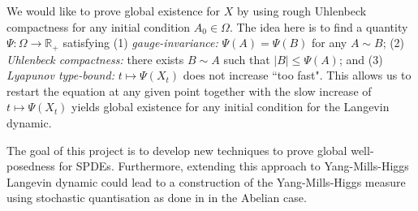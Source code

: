 \documentclass[12pt]{article}
\numberwithin{equation}{section}
\theoremstyle{definition}
\theoremstyle{remark}
\newcommand{\R}{\mathbb R}
\newcommand{\1}{\mathbf 1}
\newcommand{\<}{\langle}
\renewcommand{\>}{\rangle}
\newcommand{\orange}[1]{\textcolor{orange}{#1}}
\begin{document}
We would like to prove global existence for $X$ by using rough Uhlenbeck compactness for any initial condition $A_0\in \Omega$. The idea here is to find a quantity $\Psi:\Omega\to\R_+$ satisfying (1) \textit{gauge-invariance:} $\Psi(A)=\Psi(B)$ for any $A\sim B$; (2) \textit{Uhlenbeck compactness:} there exists $B\sim A$ such that $|B|\leq \Psi(A)$; and (3) \textit{Lyapunov type-bound:} $t\mapsto \Psi(X_t)$ does not increase ``too fast". 
%
%
This allows us to restart the equation at any given point together with the slow increase of $t\mapsto \Psi(X_t)$ yields global existence for any initial condition for the Langevin dynamic. 

The goal of this project is to develop new techniques to prove global well-posedness for SPDEs. Furthermore, extending this approach to Yang-Mills-Higgs Langevin dynamic could lead to a construction of the Yang-Mills-Higgs measure using stochastic quantisation as done in \cite{BC24_YM} in the Abelian case.







%
%
\end{document}
